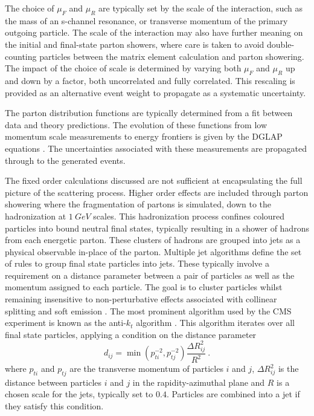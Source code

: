 The choice of $\mu_F$ and $\mu_R$ are typically set by the scale of the interaction, such as the mass of an s-channel resonance, or transverse momentum of the primary outgoing particle. The scale of the interaction may also have further meaning on the initial and final-state parton showers, where care is taken to avoid double-counting particles between the matrix element calculation and parton showering. The impact of the choice of scale is determined by varying both $\mu_F$ and $\mu_R$ up and down by a factor, both uncorrelated and fully correlated. This rescaling is provided as an alternative event weight to propagate as a systematic uncertainty.

The parton distribution functions are typically determined from a fit between data and theory predictions. The evolution of these functions from low momentum scale measurements to energy frontiers is given by the DGLAP equations \cite{Altarelli:1977zs,Dokshitzer:1977sg,Gribov:1972ri}. The uncertainties associated with these measurements are propagated through to the generated events.

The fixed order calculations discussed are not sufficient at encapsulating the full picture of the scattering process. Higher order effects are included through parton showering where the fragmentation of partons is simulated, down to the hadronization at $\SI{1}{GeV}$ scales. This hadronization process confines coloured particles into bound neutral final states, typically resulting in a shower of hadrons from each energetic parton. These clusters of hadrons are grouped into jets as a physical observable in-place of the parton. Multiple jet algorithms define the set of rules to group final state particles into jets. These typically involve a requirement on a distance parameter between a pair of particles as well as the momentum assigned to each particle. The goal is to cluster particles whilst remaining insensitive to non-perturbative effects associated with collinear splitting and soft emission \cite{Buckley:2011ms}. The most prominent algorithm used by the CMS experiment is known as the anti-$k_t$ algorithm \cite{Salam:2009jx}. This algorithm iterates over all final state particles, applying a condition on the distance parameter
%
\begin{equation}
    d_{ij} = \min\left(p_{ti}^{-2},p_{tj}^{-2}\right)\frac{\Delta R_{ij}^2}{R^2}\ .
\end{equation}
%
where $p_{ti}$ and $p_{tj}$ are the transverse momentum of particles $i$ and $j$, $\Delta R_{ij}^2$ is the distance between particles $i$ and $j$ in the rapidity-azimuthal plane and $R$ is a chosen scale for the jets, typically set to $0.4$. Particles are combined into a jet if they satisfy this condition.


